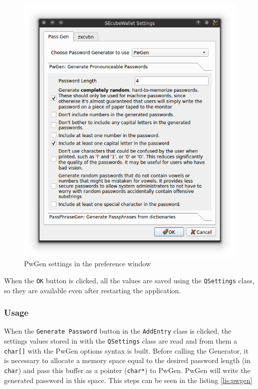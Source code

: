 \begin{figure}[htb]
  \centering
  \captionsetup{justification=centering}
  \includegraphics[width=0.8\columnwidth]{chapters/figures/development/pwgenSett}
  \caption{PwGen settings in the preference window}
  \label{fig:pwgenSett}
\end{figure}

When the \texttt{OK} button is clicked, all the values are saved using the \texttt{QSettings} class, so they are available even after restarting the application.

\subsubsection*{Usage}

When the \texttt{Generate Password} button in the \texttt{AddEntry} class is clicked, the settings values stored in with the \texttt{QSettings} class are read and from them a \texttt{char[]} with the PwGen options syntax is built. Before calling the Generator, it is necessary to allocate a memory space equal to the desired password length (in \texttt{char}) and pass this buffer as a pointer (\texttt{char*}) to PwGen. PwGen will write the generated password in this space. This steps can be seen in the listing \ref{lis:pwgen}



